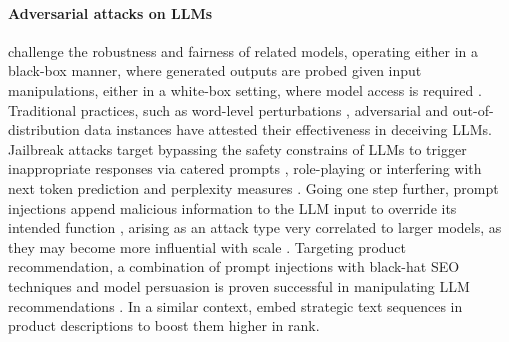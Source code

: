 \paragraph{Adversarial attacks on LLMs} challenge the robustness and fairness of related models, operating either in a black-box manner, where generated outputs are probed given input manipulations, either in a white-box setting, where model access is required \cite{shayegani2023surveyvulnerabilitieslargelanguage}. Traditional practices, such as word-level perturbations \cite{wang2023largelanguagemodelsreally}, adversarial and out-of-distribution data instances \cite{wang2023robustnesschatgptadversarialoutofdistribution} have attested their effectiveness in deceiving LLMs. Jailbreak attacks target bypassing the safety constrains of LLMs to trigger inappropriate responses via catered prompts \cite{wei2023jailbrokendoesllmsafety,liu2024autodangeneratingstealthyjailbreak}, role-playing \cite{jin2024guardroleplayinggeneratenaturallanguage} or interfering with next token prediction \cite{zhao2024weaktostrongjailbreakinglargelanguage} and perplexity measures \cite{boreiko2024realisticthreatmodellarge}.
Going one step further, prompt injections append malicious information to the LLM input to override its intended function \cite{li2023evaluatinginstructionfollowingrobustnesslarge,indirect-prompt-inject, liu2024automaticuniversalpromptinjection}, arising as an attack type very correlated to larger models, as they may become more influential with scale \cite{mckenzie2024inversescalingbiggerisnt}. %
Targeting product recommendation, a combination of prompt injections with black-hat SEO techniques and model persuasion is proven successful in manipulating LLM recommendations \cite{nestaas2024adversarialsearchengineoptimization}. In a similar context, \citet{kumar2024manipulatinglargelanguagemodels} embed strategic text sequences in product descriptions to boost them higher in rank.